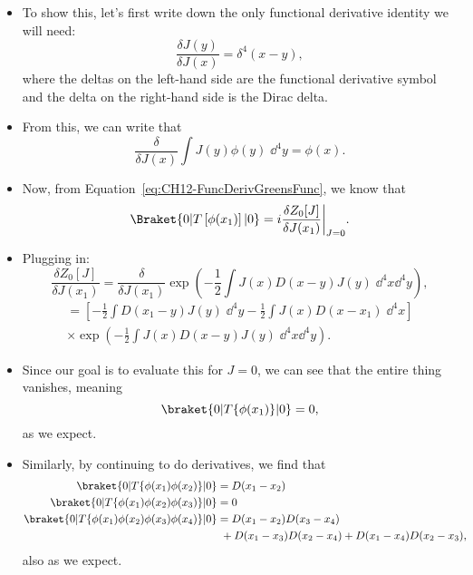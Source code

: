 \begin{itemize}
    \item To show this, let's first write down the only functional derivative identity we will need:
        \begin{equation}
            \frac{\delta J(y)}{\delta J(x)} = \delta^4(x-y),
        \end{equation}
        where the deltas on the left-hand side are the functional derivative symbol and the delta on the right-hand side is the Dirac delta.
    \item From this, we can write that
        \begin{equation}
            \frac{\delta}{\delta J(x)} \int J(y) \phi(y) \;\dd^4y = \phi(x).
        \end{equation}
    \item Now, from Equation~\eqref{eq:CH12-FuncDerivGreensFunc}, we know that
        \begin{equation}
            \Braket{0 | T\left[ \phi(x_1) \right] | 0} = i \frac{\delta Z_0[J]}{\delta J(x_1)}\bigg|_{J=0}.
        \end{equation}
    \item Plugging in:
        \begin{equation}
            \frac{\delta Z_0[J]}{\delta J(x_1)} = \frac{\delta}{\delta J(x_1)} \exp\left( -\frac{1}{2}\int J(x)D(x-y)J(y) \;\dd^4x\dd^4y \right),
        \end{equation}
        \begin{multline}
            = \left[ -\frac{1}{2}\int D(x_1-y) J(y) \;\dd^4y - \frac{1}{2}\int J(x) D(x-x_1) \;\dd^4x \right] \\ \times \exp\left( -\frac{1}{2}\int J(x)D(x-y)J(y)\;\dd^4x\dd^4y \right).
        \end{multline}
    \item Since our goal is to evaluate this for $J=0$, we can see that the entire thing vanishes, meaning
        \begin{equation}
            \braket{0 | T\{\phi(x_1)\} | 0} = 0,
        \end{equation}
        as we expect.
    \item Similarly, by continuing to do derivatives, we find that
        \begin{align}
            \braket{0 | T\{\phi(x_1)\phi(x_2)\} | 0} &= D(x_1 - x_2) \ & \\
            \braket{0 | T\{\phi(x_1)\phi(x_2)\phi(x_3)\} | 0} &= 0 \ & \\
            \braket{0 | T\{\phi(x_1)\phi(x_2)\phi(x_3)\phi(x_4)\} | 0} &= D(x_1 - x_2)D(x_3 - x_4)&\\ 
            \ &\  + D(x_1 - x_3)D(x_2 - x_4) + D(x_1 - x_4)D(x_2 - x_3),
        \end{align}
        also as we expect.
\end{itemize}


